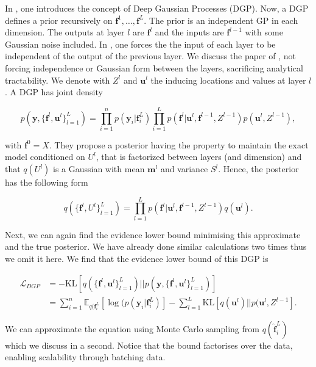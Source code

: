 \documentclass[12pt,a4paper,oneside]{book}
\begin{document}
In \cite{damianou2013deep}, one introduces the concept of Deep Gaussian Processes (DGP). Now, a DGP defines a prior recursively on $\bm{f}^1, \ldots, \bm{f}^L$. The prior is an independent GP in each dimension. The outputs at layer $l$ are $\bm{f}^l$ and the inputs are $\bm{f}^{l-1}$ with some Gaussian noise included. In \cite{damianou2013deep}, one forces the the input of each layer to be independent of the output of the previous layer. We discuss the paper of \cite{salimbeni2017doubly}, not forcing independence or Gaussian form between the layers, sacrificing analytical tractability. We denote with $Z^{l}$ and $\bm{u}^l$ the inducing locations and values at layer $l$. A DGP has joint density 

\begin{equation}
p(\bm{y}, \{ \bm{f}^l, \bm{u}^l \}^L_{l=1}) = \prod\limits_{i=1}^n p(\bm{y}_i|\bm{f}_i^L)\prod\limits_{i=1}^L p(\bm{f}^l|\bm{u}^l,\bm{f}^{l-1}, Z^{l-1})p(\bm{u}^l, Z^{l-1}),
\end{equation}

with $\bm{f}^0 = X$. They propose a posterior having the property to maintain the exact model conditioned on $U^l$, that is factorized between layers (and dimension) and that $q(U^l)$ is a Gaussian with mean $\bm{m}^l$ and variance $S^l$. Hence, the posterior has the following form

\begin{equation}
q( \{ \bm{f}^l, U^l  \}_{l=1}^{L} ) = \prod\limits_{l=1}^{L} p(\bm{f}^l | \bm{u}^l , \bm{f}^{l-1}, Z^{l-1} ) q (\bm{u}^l).
\end{equation}

Next, we can again find the evidence lower bound minimising this approximate and the true posterior. We have already done similar calculations two times thus we omit it here. We find that the evidence lower bound of this DGP is 

\begin{equation}
\begin{aligned}
\mathcal{L}_{DGP} &= - \text{KL} [q( \{\bm{f}^l, \bm{u}^l \}_{l=1}^L )|| p( \bm{y}, \{\bm{f}^l , \bm{u}^l \}^{L}_{l=1} )] \\
&= \sum\limits_{i=1}^{n} \mathbb{E}_{q(\bm{f}_{i}^L}[ \log (p(\bm{y}_i | \bm{f}_i^L)] - \sum\limits_{l=1}^L \text{KL}[ q(\bm{u}^l) || p(\bm{u}^l, Z^{l-1} ].
\end{aligned}
\end{equation}

We can approximate the equation using Monte Carlo sampling from $q(\hat{\bm{f}}_i^L)$ which we discuss in a second. Notice that the bound factorises over the data, enabling scalability through batching data.
\end{document}
